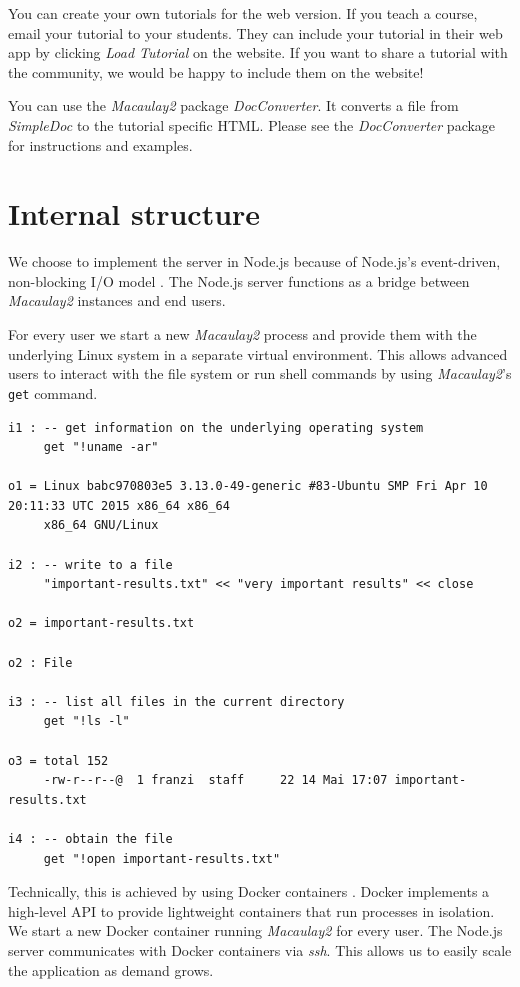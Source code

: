 \documentclass[twocolumn]{article}
\def\M2{{\it Macaulay2}}
\begin{document}
You can create your own tutorials for the web version. If you teach a course,
email your tutorial to your students. They can include your tutorial in their web app by clicking
{\it Load Tutorial} on the website.
If you want to share a tutorial with the community, we would
be happy to include them on the website!

You can use the \M2 package {\it DocConverter}.
It converts a file from {\it SimpleDoc} to the tutorial specific HTML. Please see the
{\it DocConverter} package for instructions and examples.


\section{Internal structure}

We choose to implement the server in Node.js
because of Node.js's event-driven, non-blocking I/O model \cite{nodejs}.
The Node.js server functions as a bridge between \M2 instances and end users.

For every user we start a new \M2 process and
provide them with the underlying Linux system in a separate virtual environment.
This allows advanced users to
interact with the file system or run shell commands by using \M2's {\tt get} command.

\begin{lstlisting}[breaklines]
i1 : -- get information on the underlying operating system
     get "!uname -ar" 

o1 = Linux babc970803e5 3.13.0-49-generic #83-Ubuntu SMP Fri Apr 10 20:11:33 UTC 2015 x86_64 x86_64
     x86_64 GNU/Linux

i2 : -- write to a file     
     "important-results.txt" << "very important results" << close

o2 = important-results.txt

o2 : File

i3 : -- list all files in the current directory
     get "!ls -l"

o3 = total 152
     -rw-r--r--@  1 franzi  staff     22 14 Mai 17:07 important-results.txt
 
i4 : -- obtain the file
     get "!open important-results.txt"
\end{lstlisting}

Technically, this is achieved by using Docker containers \cite{docker}. Docker implements
a high-level API to provide lightweight containers that run processes in isolation.
We start a new Docker container running \M2 for every user. The Node.js
server communicates with Docker containers via {\it ssh}. This allows us to easily
scale the application as demand grows.
\end{document}
